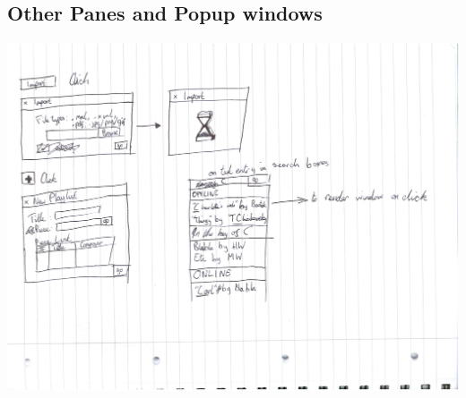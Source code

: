 \documentclass[bibtotocnumbered]{article}
\begin{document}
\begin{appendices}
\subsection{Other Panes and Popup windows}
\includegraphics[width=500pt]{other_panes_and_popups}
\end{appendices}
\end{document}
